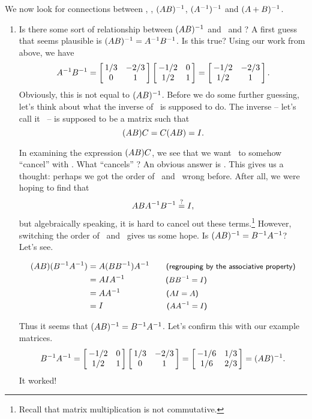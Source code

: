 {\begin{enumerate}
\end{enumerate}


We now look for connections between \ttai, \ttbi, $(\tta\ttb)^{-1}$, $(\ttai)^{-1}$ and $(\tta+\ttb)^{-1}$. 
\drawexampleline%

\begin{enumerate}
\addtocounter{enumi}{2}
\item	 Is there some sort of relationship between $(\tta\ttb)^{-1}$ and \ttai\ and \ttbi? A first guess that seems plausible is $(\tta\ttb)^{-1} = \ttai\ttbi$. Is this true? Using our work from above, we have 
		$$\ttai\ttbi = \bmx{cc} 1/3 & -2/3\\ 0 & 1\emx\bmx{cc} -1/2 & 0 \\ 1/2 & 1\emx = \bmx{cc} -1/2 & -2/3 \\ 1/2 & 1\emx.$$
		Obviously, this is not equal to $(\tta\ttb)^{-1}$. Before we do some further guessing, let's think about what the inverse of \tta\ttb\ is supposed to do. The inverse -- let's call it \ttc\ -- is supposed to be a matrix such that $$(\tta\ttb)\ttc = \ttc(\tta\ttb) = \tti.$$ 
%


%		
In examining the expression $(\tta\ttb)\ttc$, we see that we want \ttb\ to somehow ``cancel'' with \ttc. What ``cancels'' \ttb? An obvious answer is \ttbi. This gives us a thought: perhaps we got the order of \ttai\ and \ttbi\ wrong before. After all, we were hoping to find that $$\tta\ttb\ttai\ttbi \overset{\text{?}}{=} \tti,$$ but algebraically speaking, it is hard to cancel out these terms.\footnote{Recall that matrix multiplication is not commutative.}
		However, switching the order of \ttai\ and \ttbi\ gives us some hope. Is $(\tta\ttb)^{-1} = \ttbi\ttai$? Let's see.
		
\begin{align*}
	(\tta\ttb)(\ttbi\ttai) &= \tta(\ttb\ttbi)\ttai \textsf{\hskip 20pt  \small(regrouping by the associative property)}\\ 
						&= \tta\tti\ttai \textsf{\hskip 49pt  \small($\ttb\ttbi = \tti$)}\\
						&= \tta\ttai \textsf{\hskip 55pt  \small($\tta\tti = \tta$)}\\
						&= \tti \textsf{\hskip 76pt  \small($\tta\ttai=\tti$)}
\end{align*}

Thus it seems that $(\tta\ttb)^{-1} = \ttbi\ttai$. Let's confirm this with our example matrices. 
   $$\ttbi\ttai = \bmx{cc} -1/2 & 0 \\ 1/2 & 1\emx\bmx{cc} 1/3 & -2/3\\ 0 & 1\emx = \bmx{cc} -1/6 & 1/3\\ 1/6 & 2/3 \emx = (\tta\ttb)^{-1}.$$
   It worked!
   

\end{enumerate}}
